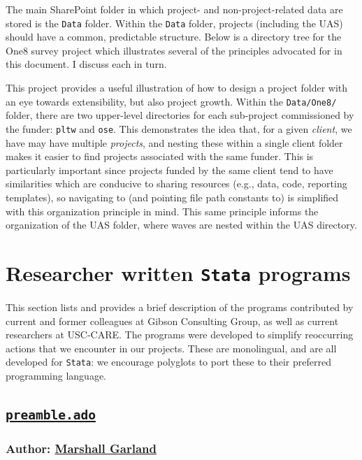 \documentclass[11pt]{article}
\begin{document}
{The main SharePoint folder in which project- and non-project-related data are stored is the \texttt{Data} folder. Within the \texttt{Data} folder, projects (including the UAS) should have a common, predictable structure. Below is a directory tree for the One8 survey project which illustrates several of the principles advocated for in this document. I discuss each in turn.


This project provides a useful illustration of how to design a project folder with an eye towards extensibility, but also project growth. Within the \texttt{Data/One8/} folder, there are two upper-level directories for each sub-project commissioned by the funder: \texttt{pltw} and \texttt{ose}. This demonstrates the idea that, for a given \textit{client}, we have may have multiple \textit{projects}, and nesting these within a single client folder makes it easier to find projects associated with the same funder. This is particularly important since projects funded by the same client tend to have similarities which are conducive to sharing resources (e.g., data, code, reporting templates), so navigating to (and pointing file path constants to) is simplified with this organization principle in mind. This same principle informs the organization of the UAS folder, where waves are nested within the UAS directory. 

\section{Researcher written \texttt{Stata} programs} \label{sec:ados}
This section lists and provides a brief description of the programs contributed by current and former colleagues at Gibson Consulting Group, as well as current researchers at USC-CARE. The programs were developed to simplify reoccurring actions that we encounter in our projects. These are monolingual, and are all developed for \texttt{Stata}: we encourage polyglots to port these to their preferred programming language.
\subsection{\href{https://github.com/marshallwg/preamble-ado}{\texttt{preamble.ado}}}
\subsubsection{Author: \href{mailto:garlandm@usc.edu}{Marshall Garland}}
}
\end{document}

